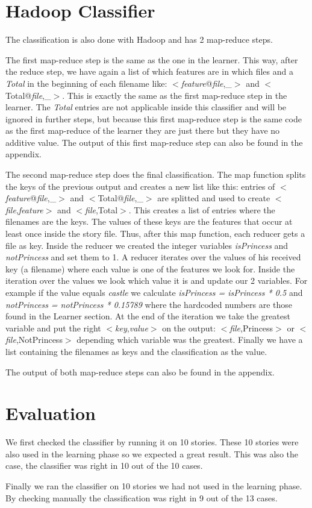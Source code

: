 \documentclass{article}
\begin{document}
\section{Hadoop Classifier}
The classification is also done with Hadoop and has 2 map-reduce steps. 
\par
The first map-reduce step is the same as the one in the learner.
This way, after the reduce step, we have again a list of which features are in which files and a \textit{Total} in the beginning of each filename like: 
$<$\textit{feature}@\textit{file},\_$>$ and $<$Total@\textit{file},\_$>$. This is exactly the same as the first map-reduce step in the learner.
The \textit{Total} entries are not applicable inside this classifier and will be ignored in further steps, but because this first map-reduce step is the same code as the first map-reduce of the learner they are just there but they have no additive value. The output of this first map-reduce step can also be found in the appendix.
\par
The second map-reduce step does the final classification. The map function splits the keys of the previous output and creates a new list like this: entries of $<$\textit{feature}@\textit{file},\_$>$ and $<$Total@\textit{file},\_$>$ are splitted and used to create $<$\textit{file},\textit{feature}$>$ and $<$\textit{file},Total$>$.
This creates a list of entries where the filenames are the keys. 
The values of these keys are the features that occur at least once inside the story file. 
Thus, after this map function, each reducer gets a file as key. 
Inside the reducer we created the integer variables \textit{isPrincess} and \textit{notPrincess} and set them to 1. 
A reducer iterates over the values of his received key (a filename) where each value is one of the features we look for.
Inside the iteration over the values we look which value it is and update our 2 variables. 
For example if the value equals \textit{castle} we calculate \textit{isPrincess = isPrincess * 0.5} 
and \textit{notPrincess = notPrincess * 0.15789} where the hardcoded numbers are those found in the Learner section.
At the end of the iteration we take the greatest variable and put the right $<$\textit{key},\textit{value}$>$ on the output: $<$\textit{file},Princess$>$ or $<$\textit{file},NotPrincess$>$ depending which variable was the greatest.
Finally we have a list containing the filenames as keys and the classification as the value.
\par
The output of both map-reduce steps can also be found in the appendix.
\section{Evaluation}
We first checked the classifier by running it on 10 stories. These 10 stories were also used in the learning phase so we expected a great result.
This was also the case, the classifier was right in 10 out of the 10 cases.
\par
Finally we ran the classifier on 10 stories we had not used in the learning phase. By checking manually the classification was right in 9 out of the 13 cases.
\end{document}
